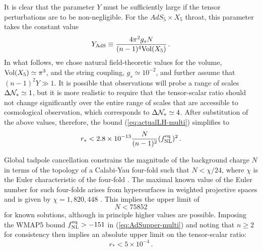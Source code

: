 It is clear that the parameter $Y$ 
must be sufficiently large if the tensor perturbations 
are to be non-negligible. For the $AdS_5 \times X_5$ throat, this parameter  
takes the constant value    
% 
\begin{equation}
\label{eq:YAds-multi}
Y_{\mathrm{AdS}} \equiv \frac{4\pi^2 g_s N}{(n-1)^4 \mathrm{Vol} (X_5)} \,.
\end{equation}
% 
In what follows, we chose natural field-theoretic values for the volume, 
$\mathrm{Vol} (X_5) \simeq \pi^3$, and the string coupling, 
$g_s \simeq 10^{-2}$, and further assume that 
$(n-1)^2 Y \gg 1$. It is possible that observations will probe a 
range of scales $\Delta \mathcal{N}_* \simeq 1$, 
but it is more realistic to require that 
the tensor-scalar ratio should not change significantly over the 
entire range of scales that are accessible to cosmological observation,  
which corresponds to $\Delta \mathcal{N}_* \simeq 4$.
After substitution of the above values, therefore, 
the bound (\ref{eq:actualLH-multi}) simplifies to
%  
\begin{equation}
\label{eq:AdSupper-multi}
r_* < 2.8 \times 10^{-13} \frac{N}{(n-1)^2} (f_{\mathrm{NL}}^{\mathrm{eq}})^2 \,.
\end{equation}
% 


Global tadpole cancellation constrains the magnitude of
the background charge $N$ in terms of the topology of 
a Calabi-Yau four-fold such that $N < \chi /
24$, where $\chi$ is the Euler characteristic of the four-fold
\cite{witten1,witten2,witten3,sethi,gkp,klemm}. 
The  maximal known value of the Euler number for such four-folds arises from 
hypersurfaces in weighted projective spaces and is given by 
$\chi = 1, 820,448$ \cite{klemm}. This implies the upper limit of 
% 
\begin{equation}
\label{eq:Nlimit-multi} 
N < 75852
\end{equation}
% 
for known solutions, although in principle higher values are possible. 
Imposing the WMAP5 bound $f_{\mathrm{NL}}^{\mathrm{eq}}>-151$ in (\ref{eq:AdSupper-multi})
and noting that $n \ge 2$ for consistency then implies an absolute
upper limit 
on the tensor-scalar ratio:
%  
\begin{equation}
\label{eq:rupper-multi}
r_* < 5 \times 10^{-4} \, .
\end{equation}
% 


